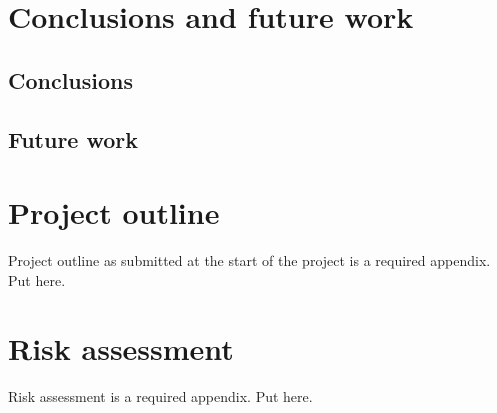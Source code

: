 \section{Conclusions and future work} %
    \subsection{Conclusions}
	\lipsum[1]
	
	\subsection{Future work}
    \lipsum[1-2] \cite{ref:jCAS10,ref:jCAS09,ref:jCAS09a} \lipsum[3-5]



\printbibliography[title={References},heading=bibintoc] %



\begin{uomappendix} 
    \section{Project outline}
    Project outline as submitted at the start of the project is a required appendix. Put here. 
    
    \section{Risk assessment}
    Risk assessment is a required appendix. Put here.
    
\end{uomappendix}


